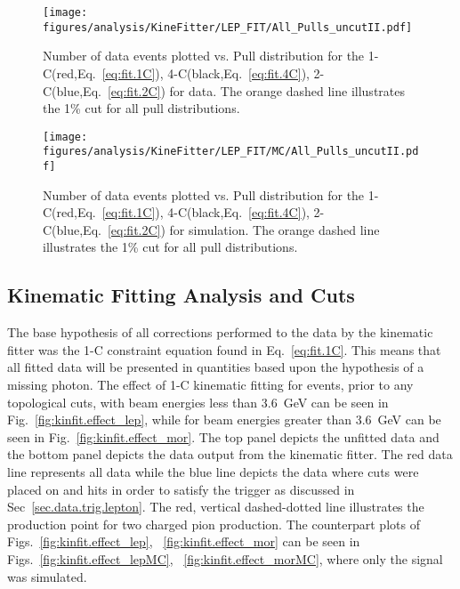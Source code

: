 \begin{figure}[h!]\begin{center}
\texttt{[image: \\figures/analysis/KineFitter/LEP\_FIT/All\_Pulls\_uncutII.pdf]}
\caption[Number of data events plotted vs. Pull distribution for the 1-C(red), 4-C(black), 2-C(blue) for  data]{\label{fig:kinfit.analysispulls}Number of data events plotted vs. Pull distribution for the 1-C(red,Eq.~\ref{eq:fit.1C}), 4-C(black,Eq.~\ref{eq:fit.4C}), 2-C(blue,Eq.~\ref{eq:fit.2C}) for  data. The orange dashed line illustrates the 1\% cut for all pull distributions.}
\end{center}\end{figure}

\begin{figure}[h!]\begin{center}
\texttt{[image: \\figures/analysis/KineFitter/LEP\_FIT/MC/All\_Pulls\_uncutII.pdf]}
\caption[Number of data events plotted vs. Pull distribution for the 1-C(red), 4-C(black), 2-C(blue) for  simulation]{\label{fig:kinfit.analysispulls_MC}Number of data events plotted vs. Pull distribution for the 1-C(red,Eq.~\ref{eq:fit.1C}), 4-C(black,Eq.~\ref{eq:fit.4C}), 2-C(blue,Eq.~\ref{eq:fit.2C}) for  simulation. The orange dashed line illustrates the 1\% cut for all pull distributions.}
\end{center}\end{figure}
\FloatBarrier
%
%
%
\subsection{Kinematic Fitting Analysis and Cuts}\label{sec:analysis.fitting.compare}

The base hypothesis of all corrections performed to the data by the kinematic fitter was the 1-C constraint equation found in Eq.~\ref{eq:fit.1C}. This means that all fitted data will be presented in quantities based upon the hypothesis of a missing photon. The effect of 1-C kinematic fitting for events, prior to any topological cuts, with beam energies less than 3.6~GeV can be seen in Fig.~\ref{fig:kinfit.effect_lep}, while for beam energies greater than 3.6~GeV can be seen in Fig.~\ref{fig:kinfit.effect_mor}. The top panel depicts the unfitted data and the bottom panel depicts the data output from the kinematic fitter. The red data line represents all data while the blue line depicts the data where cuts were placed on  and  hits in order to satisfy the trigger as discussed in Sec~\ref{sec.data.trig.lepton}. The red, vertical dashed-dotted line illustrates the production point for two charged pion production. The  counterpart plots of Figs.~\ref{fig:kinfit.effect_lep}, ~\ref{fig:kinfit.effect_mor} can be seen in Figs.~\ref{fig:kinfit.effect_lepMC}, ~\ref{fig:kinfit.effect_morMC}, where only the \piz signal was simulated.

